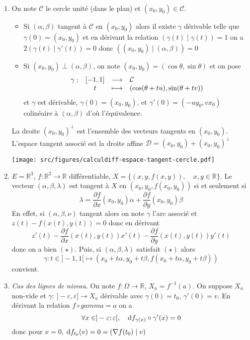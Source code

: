 \begin{ex}~
    \begin{enumerate}
        \item On note $\mathcal C$ le cercle unité (dans le plan) et $(x_0, y_0)\in\mathcal C$. \begin{itemize}
            \item Si $(\alpha, \beta)$ tangent à $\mathcal C$ en $(x_0, y_0)$ alors il existe $\gamma$ dérivable telle que $\gamma(0)=(x_0, y_0)$ et en dérivant la relation $(\gamma(t)\;|\;\gamma(t))=1$ on a $2(\gamma(t)\;|\;\gamma'(t))=0$ donc $((x_0, y_0)\;|\;(\alpha, \beta))=0$
            \item Si $(x_0, y_0)\perp (\alpha, \beta)$, on note $(x_0, y_0)=(\cos\theta, \sin\theta)$ et on pose \[
                \begin{matrix}
                    \gamma : & [-1, 1] & \longrightarrow & \mathcal C\hspace{3.5cm} \\
                              & t & \longmapsto & (\cos(\theta+tu), \sin(\theta+tv))
                \end{matrix}
                \]
                et $\gamma$ est dérivable, $\gamma(0)=(x_0, y_0)$, et $\gamma'(0)=(-uy_0, vx_0)$ colinéaire à $(\alpha, \beta)$ d'où l'équivalence.
        \end{itemize}
        La droite $(x_0, y_0)^{\perp}$ est l'ensemble des vecteurs tangents en $(x_0, y_0)$. L'espace tangent associé est la droite affine $\mathcal D=(x_0, y_0)+(x_0, y_0)^{\perp}$
        \begin{center}
            \texttt{[image: src/figures/calculdiff-espace-tangent-cercle.pdf]}
        \end{center}

    \item $E=\mathbb R^3$, $f:\mathbb R^2\to \mathbb R$ différentiable, $X=\{(x, y, f(x, y)), \quad x,y\in\mathbb R\}$. Le vecteur $(\alpha, \beta, \lambda)$ est tangent à $X$ en $(x_0, y_0, f(x_0, y_0))$ si et seulement si \[
            \lambda= \frac{\partial f}{\partial x} (x_0, y_0)\alpha + \frac{\partial f}{\partial y}(x_0, y_0)\beta \tag{$\star$}
        \]
        En effet, si $(\alpha, \beta, \nu)$ tangent alors on note $\gamma$ l'arc associé et $z(t)-f(x(t), y(t))=0$ donc en dérivant \[
            z'(t)- \frac{\partial f}{\partial x} (x(t), y(t))x'(t)- \frac{\partial f}{\partial y} (x(t), y(t))y'(t)
        \]
        donc on a bien $(\star)$. Puis, si $(\alpha, \beta, \lambda)$ satisfait $(\star)$ alors \[
            \gamma: t\in]-1, 1[\longmapsto (x_0+t\alpha, y_0+t\beta, f(x_0+t\alpha, y_0+t\beta))
        \]
        convient.

    \item \emph{Cas des lignes de niveau}. On note $f:\Omega\to \mathbb R$, $X_a=f^{-1}(a)$. On suppose $X_a$ non-vide et $\gamma:~]-\varepsilon, \varepsilon[ \to X_a$ dérivable avec $\gamma(0)=t_0$, $\gamma'(0)=v$. En dérivant la relation $f\circ gamma=a$ on a \[\forall x\in ]-\varepsilon; \varepsilon[, \quad \mathrm{d} f_{\gamma(x)}\circ \gamma'(x)=0\]
        donc pour $x=0$, $\mathrm{d} f_{t_0}(v)=0=(\nabla f(t_0)\;|\;v)$
    \end{enumerate}
\end{ex}

